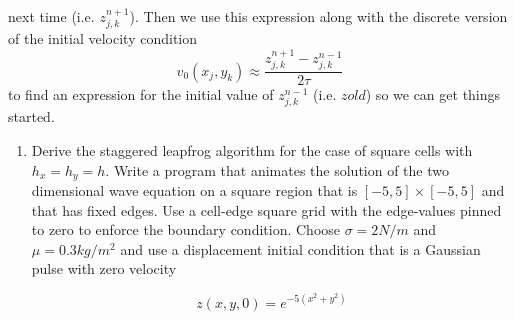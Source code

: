 next time (i.e. $z^{n+1}_{j,k} $). Then we use this expression along with the discrete version
of the initial velocity condition
\begin{equation}\label{eq:66}
v_0(x_j,y_k)\approx \frac{z^{n+1}_{j,k}-z^{n-1}_{j,k}}{2\tau}
\end{equation}
to find an expression for the initial value of $z^{n-1}_{j,k}$ (i.e. $zold$) so we can get things
started.
\begin{problem}\label{P6.2} 

\begin{enumerate}[label=(\alph*)]
	\item Derive the staggered leapfrog algorithm for the case of square cells
with $h_x = h_y = h$. Write a program that animates the solution of the
two dimensional wave equation on a square region that is $[−5,5] ×
[−5,5]$ and that has fixed edges. Use a cell-edge square grid with
the edge-values pinned to zero to enforce the boundary condition.
Choose $\sigma = 2 N/m$ and $ \mu = 0.3 kg/m^2$
and use a displacement initial
condition that is a Gaussian pulse with zero velocity

\begin{equation}\label{eq:67}
z(x,y,0) = e^{-5(x^2+y^2)}
\end{equation}


\end{enumerate}
\end{problem}
